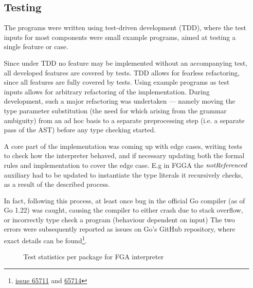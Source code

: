\subsection{Testing}

The programs were written using test-driven development (TDD), where the test
inputs for most components were small example programs, aimed at testing a
single feature or case.

Since under TDD no feature may be implemented without an accompanying test, all
developed features are covered by tests. TDD allows for fearless refactoring,
since all features are fully covered by tests. Using example programs as test
inputs allows for arbitrary refactoring of the implementation. During
development, such a major refactoring was undertaken --- namely moving the type parameter
substitution (the need for which arising from the grammar ambiguity) from an ad
hoc basis to a separate preprocessing step (i.e. a separate pass of the AST)
before any type checking started.

A core part of the implementation was coming up with edge cases, writing tests
to check how the interpreter behaved, and if necessary updating both the formal
rules and implementation to cover the edge case. E.g in FGGA the $\mathit{notReferenced}$
auxiliary had to be updated to instantiate the type literals it recursively
checks, as a result of the described process.

In fact, following this process, at least once bug in the official Go compiler
(as of Go 1.22) was caught, causing the compiler to either crash due to stack
overflow, or incorrectly type check a program (behaviour dependent on input) The
two errors were subsequently reported as issues on Go's GitHub repository, where
exact details can be
found\footnote{\href{https://github.com/golang/go/issues/65711}{issue 65711} and
    \href{https://github.com/golang/go/issues/65714}{65714}}.

%


\begin{figure}
    \begin{center}
    \end{center}
    \caption{Test statistics per package for FGA interpreter\protect\footnotemark}
\end{figure}

